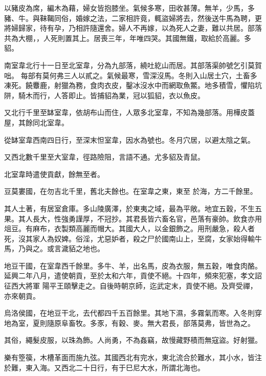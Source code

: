 \begin{pinyinscope}
 以豬皮為席，編木為藉，婦女皆抱膝坐。氣候多寒，田收甚薄。無羊，少馬，多豬、牛。與靺鞨同俗，婚嫁之法，二家相許竟，輒盜婦將去，然後送牛馬為聘，更將婦歸家，待有孕，乃相許隨還舍。婦人不再嫁，以為死人之妻，難以共居。部落共為大棚，，人死則置其上。居喪三年，年唯四哭。其國無鐵，取給於高麗。多貂。



 南室韋北行十一日至北室韋，分為九部落，繞吐紇山而居。其部落渠帥號乞引莫賀咄。
 每部有莫何弗三人以貳之。氣候最寒，雪深沒馬。冬則入山居土穴，土畜多凍死。饒麞鹿，射獵為務，食肉衣皮，鑿冰沒水中而網取魚鱉。地多積雪，懼陷坑阱，騎木而行，人答即止。皆捕貂為業，冠以狐貂，衣以魚皮。



 又北行千里至缽室韋，依胡布山而住，人眾多北室韋，不知為幾部落。用樺皮蓋屋，其餘同北室韋。



 從缽室韋西南四日行，至深末怛室韋，因水為號也。冬月穴居，以避太陰之氣。



 又西北數千里至大室韋，徑路險阻，言語不通。尤多貂及青鼠。



 北室韋時遣使貢獻，餘無至者。



 豆莫婁國，在勿吉北千里，舊北夫餘也。在室韋之東，東至
 於海，方二千餘里。



 其人土著，有居室倉庫。多山陵廣澤，於東夷之域，最為平敞。地宜五穀，不生五果。其人長大，性強勇謹厚，不冠抄。其君長皆六畜名官，邑落有豪帥。飲食亦用俎豆。有麻布，衣製類高麗而帽大。其國大人，以金銀飾之。用刑嚴急，殺人者死，沒其家人為奴婢。俗淫，尤惡妒者，殺之尸於國南山上，至腐，女家始得輸牛馬，乃與之。或言濊貊之地也。



 地豆干國，在室韋西千餘里。多牛、羊，出名馬，皮為衣服，無五穀，唯食肉酪。延興二年八月，遣使朝貢，至於太和六年，貢使不絕。十四年，頻來犯塞，孝文詔征西大將軍
 陽平王頤擊走之。自後時朝京師，迄武定末，貢使不絕。及齊受禪，亦來朝貢。



 烏洛侯國，在地豆干北，去代都四千五百餘里。其地下濕，多霧氣而寒。入冬則穿地為室，夏則隨原阜畜牧。多豕，有穀、麥。無大君長，部落莫弗，皆世為之。



 其俗，繩髮皮服，以珠為飾。人尚勇，不為姦竊，故慢藏野積而無寇盜。好射獵。



 樂有箜篌，木槽革面而施九弦。其國西北有完水，東北流合於難水，其小水，皆注於難，東入海。又西北二十日行，有于巳尼大水，所謂北海也。




\end{pinyinscope}
